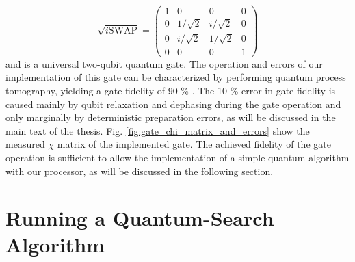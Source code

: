 \begin{equation}
	\sqrt{i\mathrm{SWAP}}  =  \left( \begin{array}{cccc} 1 & 0 & 0 & 0 \\ 0 & 1/\sqrt{2} & i/\sqrt{2} & 0 \\ 0 & i/\sqrt{2} & 1/\sqrt{2} & 0 \\ 0 & 0 & 0 & 1 \end{array} \right) \label{eq:sqrt_iswap_gate}
\end{equation}
and is a universal two-qubit quantum gate. The operation and errors of our implementation of this gate can be characterized by performing quantum process tomography, yielding a gate fidelity of 90 \% . The 10 \% error in gate fidelity is caused mainly by qubit relaxation and dephasing during the gate operation and only marginally by deterministic preparation errors, as will be discussed in the main text of the thesis. Fig. \ref{fig:gate_chi_matrix_and_errors} show the measured $\chi$ matrix of the implemented gate. The achieved fidelity of the gate operation is sufficient to allow the implementation of a simple quantum algorithm with our processor, as will be discussed in the following section.
 
\section{Running a Quantum-Search Algorithm}

